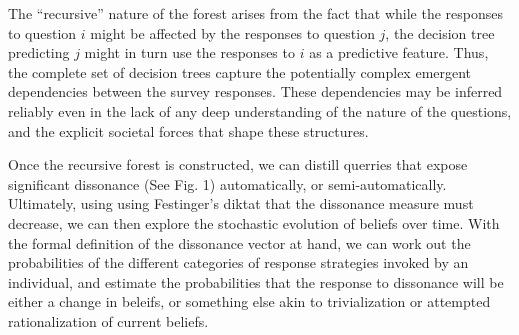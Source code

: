 \documentclass[onecolumn, compsoc,11pt]{IEEEtran}
\begin{document}
The ``recursive'' nature of the forest arises from the fact that while the responses to  question $i$ might be affected by the responses to question $j$, the decision tree predicting $j$ might in turn use the responses to  $i$ as a predictive feature. Thus, the complete set of decision trees capture the potentially complex emergent dependencies between the survey responses. These dependencies may be inferred reliably even in the lack of any deep understanding of the nature of the questions, and the explicit societal forces that shape these structures.

Once the recursive forest is constructed, we can distill querries that expose significant dissonance (See Fig. 1) automatically, or semi-automatically. Ultimately, using using Festinger's diktat that the dissonance measure must decrease, we can then explore the stochastic evolution of beliefs over time. With the formal definition of  the dissonance vector at hand, we can work out the probabilities of the different categories of  response strategies invoked by an individual, and estimate the probabilities that the response to dissonance will be either a change in beleifs, or something else akin to trivialization or attempted rationalization of current beliefs.
\end{document}
